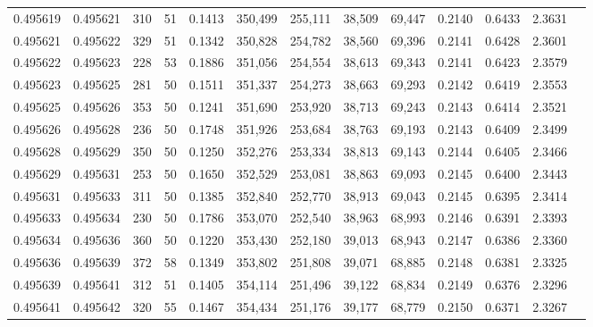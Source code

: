 \begin{tabular}{rrrrrrrrrrrrr}
0.495619 & 0.495621 &   310 &  51 &                                     0.1413 & 350,499 & 255,111 &  38,509 &  69,447 & 0.2140 & 0.6433 & 2.3631 \\
0.495621 & 0.495622 &   329 &  51 &                                     0.1342 & 350,828 & 254,782 &  38,560 &  69,396 & 0.2141 & 0.6428 & 2.3601 \\
0.495622 & 0.495623 &   228 &  53 &                                     0.1886 & 351,056 & 254,554 &  38,613 &  69,343 & 0.2141 & 0.6423 & 2.3579 \\
0.495623 & 0.495625 &   281 &  50 &                                     0.1511 & 351,337 & 254,273 &  38,663 &  69,293 & 0.2142 & 0.6419 & 2.3553 \\
0.495625 & 0.495626 &   353 &  50 &                                     0.1241 & 351,690 & 253,920 &  38,713 &  69,243 & 0.2143 & 0.6414 & 2.3521 \\
0.495626 & 0.495628 &   236 &  50 &                                     0.1748 & 351,926 & 253,684 &  38,763 &  69,193 & 0.2143 & 0.6409 & 2.3499 \\
0.495628 & 0.495629 &   350 &  50 &                                     0.1250 & 352,276 & 253,334 &  38,813 &  69,143 & 0.2144 & 0.6405 & 2.3466 \\
0.495629 & 0.495631 &   253 &  50 &                                     0.1650 & 352,529 & 253,081 &  38,863 &  69,093 & 0.2145 & 0.6400 & 2.3443 \\
0.495631 & 0.495633 &   311 &  50 &                                     0.1385 & 352,840 & 252,770 &  38,913 &  69,043 & 0.2145 & 0.6395 & 2.3414 \\
0.495633 & 0.495634 &   230 &  50 &                                     0.1786 & 353,070 & 252,540 &  38,963 &  68,993 & 0.2146 & 0.6391 & 2.3393 \\
0.495634 & 0.495636 &   360 &  50 &                                     0.1220 & 353,430 & 252,180 &  39,013 &  68,943 & 0.2147 & 0.6386 & 2.3360 \\
0.495636 & 0.495639 &   372 &  58 &                                     0.1349 & 353,802 & 251,808 &  39,071 &  68,885 & 0.2148 & 0.6381 & 2.3325 \\
0.495639 & 0.495641 &   312 &  51 &                                     0.1405 & 354,114 & 251,496 &  39,122 &  68,834 & 0.2149 & 0.6376 & 2.3296 \\
0.495641 & 0.495642 &   320 &  55 &                                     0.1467 & 354,434 & 251,176 &  39,177 &  68,779 & 0.2150 & 0.6371 & 2.3267 \\

\end{tabular}
